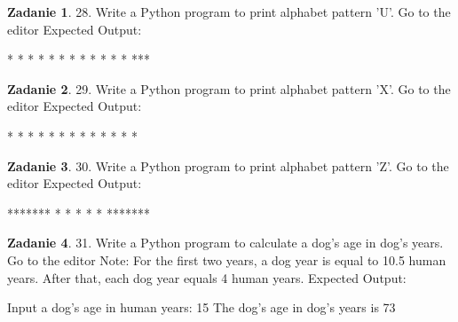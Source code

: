 \documentclass[11pt]{article}
\theoremstyle{definition}
\newtheorem{zadanie}{Zadanie}
\begin{document}
\begin{zadanie}


28. Write a Python program to print alphabet pattern 'U'. Go to the editor
Expected Output:

 *   *                                                                  
 *   *                                                                  
 *   *                                                                  
 *   *                                                                  
 *   *                                                                  
 *   *                                                                  
  *** 



\end{zadanie}

\begin{zadanie}


29. Write a Python program to print alphabet pattern 'X'. Go to the editor
Expected Output:

 *   *                                                                  
 *   *                                                                  
  * *                                                                   
   *                                                                    
  * *                                                                   
 *   *                                                                  
 *   *



\end{zadanie}

\begin{zadanie}


30. Write a Python program to print alphabet pattern 'Z'. Go to the editor
Expected Output:

*******                                                                 
     *                                                                  
    *                                                                   
   *                                                                    
  *                                                                     
 *                                                                      
*******



\end{zadanie}

\begin{zadanie}


31. Write a Python program to calculate a dog's age in dog's years. Go to the editor
Note: For the first two years, a dog year is equal to 10.5 human years. After that, each dog year equals 4 human years.
Expected Output:

Input a dog's age in human years: 15                                    
The dog's age in dog's years is 73



\end{zadanie}
\end{document}
